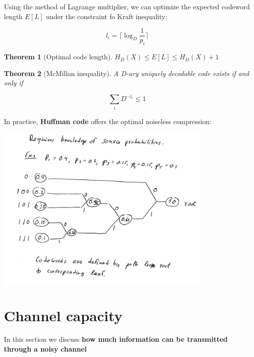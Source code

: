 \documentclass{article}
\newtheorem{theorem}{Theorem}[section]
\begin{document}
    Using the method of Lagrange multiplier, we can optimize the expected codeword length $E[L]$ under the constraint fo Kraft inequality:

    \begin{equation*}
        l_i = \lceil \log_D\frac{1}{p_i} \rceil
    \end{equation*}

    \begin{theorem}[Optimal code length]
    $H_D(X) \leq E[L] \leq H_D(X) + 1$
    \end{theorem}

    \begin{theorem}[McMillan inequality]
        A D-ary uniquely decodable code exists if and only if
        
        \begin{equation*}
            \sum_{i}D^{-l_i} \leq 1
        \end{equation*}
    \end{theorem}

    In practice, \textbf{Huffman code} offers the optimal noiseless compression:

    \includegraphics[width=0.8\textwidth]{./img/huffman-example.png}

\section{Channel capacity}
    In this section we discuss \textbf{how much information can be transmitted through a noisy channel}
\end{document}
